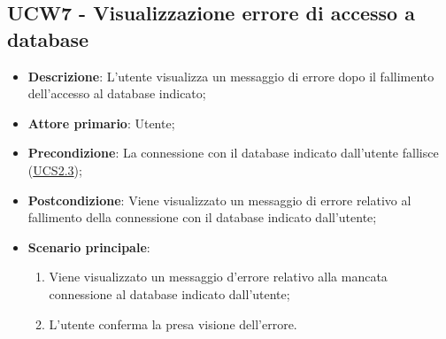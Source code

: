 \subsection{UCW7 - Visualizzazione errore di accesso a database}
\label{sub:ucw7}
\begin{itemize}
    \item \textbf{Descrizione}: L'utente visualizza un messaggio di errore dopo il fallimento dell'accesso
          al database indicato;

    \item \textbf{Attore primario}: Utente;

    \item \textbf{Precondizione}:   La connessione con il database indicato dall'utente fallisce
          (\hyperref[ssub:ucs2.3]{UCS2.3});

    \item \textbf{Postcondizione}:  Viene visualizzato un messaggio di errore relativo al fallimento della connessione
          con il database indicato dall'utente;

    \item \textbf{Scenario principale}:
          \begin{enumerate}
              \item Viene visualizzato un messaggio d'errore relativo alla mancata connessione al database indicato dall'utente;
              \item L'utente conferma la presa visione dell'errore.
          \end{enumerate}
\end{itemize}
